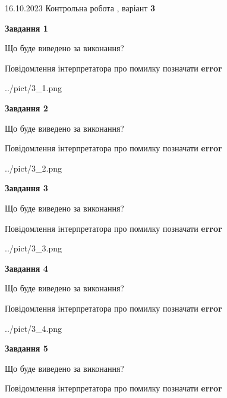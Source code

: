 \documentclass[12pt, ukrainian]{article}
\begin{document}
{\Large{16.10.2023 Контрольна робота , варіант  \No \textbf { 3 }\par}}
{
\begin {large}
{\begin {center}\textbf{Завдання 1}\end {center}}\par
Що буде виведено за виконання? \par
Повідомлення інтерпретатора про помилку позначати \textbf{error}

\begin{center}
	{../pict/3_1.png}
\end{center}
\newpage

{\begin {center}\textbf{Завдання 2}\end {center}}\par
Що буде виведено за виконання? \par
Повідомлення інтерпретатора про помилку позначати \textbf{error}

\begin{center}
	{../pict/3_2.png}
\end{center}
\newpage

{\begin {center}\textbf{Завдання 3}\end {center}}\par
Що буде виведено за виконання? \par
Повідомлення інтерпретатора про помилку позначати \textbf{error}

\begin{center}
	{../pict/3_3.png}
\end{center}
\newpage

{\begin {center}\textbf{Завдання 4}\end {center}}\par
Що буде виведено за виконання? \par
Повідомлення інтерпретатора про помилку позначати \textbf{error}

\begin{center}
	{../pict/3_4.png}
\end{center}
\newpage

{\begin {center}\textbf{Завдання 5}\end {center}}\par
Що буде виведено за виконання? \par
Повідомлення інтерпретатора про помилку позначати \textbf{error}


\end{large}}
\end{document}
